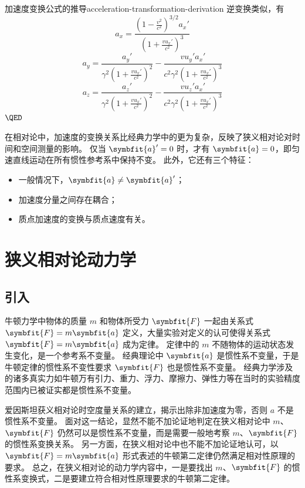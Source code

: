 \begin{example}{加速度变换公式的推导}{acceleration-transformation-derivation}
    逆变换类似，有
    \begin{equation}
        a_x = \frac{(1 - \frac{v^2}{c^2})^{3/2} a_x'}{\left(1 + \frac{v u_x'}{c^2}\right)^3}
    \end{equation}
    \begin{equation}
        a_y = \frac{a_y'}{\gamma^2 \left(1 + \frac{v u_x'}{c^2}\right)^2} - \frac{v u_y' a_x'}{c^2 \gamma^2 \left(1 + \frac{v u_x'}{c^2}\right)^3}
    \end{equation}
    \begin{equation}
        a_z = \frac{a_z'}{\gamma^2 \left(1 + \frac{v u_x'}{c^2}\right)^2} - \frac{v u_z' a_x'}{c^2 \gamma^2 \left(1 + \frac{v u_x'}{c^2}\right)^3}
    \end{equation}
    $\hfill \QED $

    在相对论中，加速度的变换关系比经典力学中的更为复杂，反映了狭义相对论对时间和空间测量的影响。
    仅当 $\symbfit{a}' = 0$ 时，才有 $\symbfit{a} = 0$，即匀速直线运动在所有惯性参考系中保持不变。
    此外，它还有三个特征：
    \begin{itemize}
        \item 一般情况下，$\symbfit{a} \neq \symbfit{a}'$；
        \item 加速度分量之间存在耦合；
        \item 质点加速度的变换与质点速度有关。
    \end{itemize}
\end{example}

\section{狭义相对论动力学}

\subsection{引入}

牛顿力学中物体的质量 $m$ 和物体所受力 $\symbfit{F}$ 一起由关系式 $ \symbfit{F} = m \symbfit{a} $ 定义，大量实验对定义的认可使得关系式 $ \symbfit{F} = m \symbfit{a}$ 成为定律。
定律中的 $m$ 不随物体的运动状态发生变化，是一个参考系不变量。
经典理论中 $\symbfit{a}$ 是惯性系不变量，于是牛顿定律的惯性系不变性要求 $\symbfit{F}$ 也是惯性系不变量。
经典力学涉及的诸多真实力如牛顿万有引力、重力、浮力、摩擦力、弹性力等在当时的实验精度范围内已被证实都是惯性系不变量。

爱因斯坦获义相对论时空度量关系的建立，揭示出除非加速度为零，否则 $a$ 不是惯性系不变量。
面对这一结论，显然不能不加论证地判定在狭义相对论中 $m$、$\symbfit{F}$ 仍然可以是惯性系不变量，而是需要一般地考察 $m$、$\symbfit{F}$ 的惯性系变换关系。
另一方面，在狭义相对论中也不能不加论证地认可，以 $ \symbfit{F} = m \symbfit{a} $ 形式表述的牛顿第二定律仍然满足相对性原理的要求。
总之，在狭义相对论的动力学内容中，一是要找出 $m$、$\symbfit{F}$ 的惯性系变换式，二是要建立符合相对性原理要求的牛顿第二定律。

